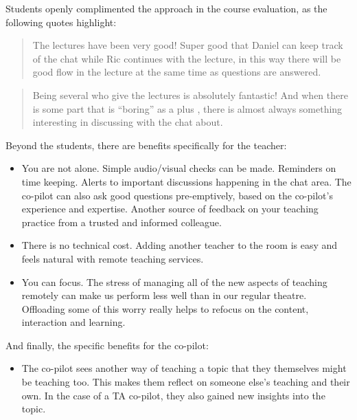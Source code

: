 \documentclass[sigconf,natbib=false]{acmart}
\begin{document}
\noindent
Students openly complimented the approach in the course evaluation, as the following quotes highlight:

\begin{quote}
The lectures have been very good! Super good that Daniel can keep track of the chat while Ric continues with the lecture, in this way there will be good flow in the lecture at the same time as questions are answered.
\end{quote}

\begin{quote}
Being several who give the lectures is absolutely fantastic! And when there is some part that is \enquote{boring} as a plus , there is almost always something interesting in discussing with the chat about.
\end{quote}

\noindent
Beyond the students, there are benefits specifically for the teacher:

\begin{itemize}
  \item You are not alone. Simple audio/visual checks can be made. Reminders on time keeping. Alerts to important discussions happening in the chat area. The co-pilot can also ask good questions pre-emptively, based on the co-pilot's experience and expertise. Another source of feedback on your teaching practice from a trusted and informed colleague.

  \item There is no technical cost. Adding another teacher to the room is easy and feels natural with remote teaching services.

  \item You can focus. The stress of managing all of the new aspects of teaching remotely can make us perform less well than in our regular theatre. Offloading some of this worry really helps to refocus on the content, interaction and learning.
\end{itemize}

\noindent
And finally, the specific benefits for the co-pilot:

\begin{itemize}
  \item The co-pilot sees another way of teaching a topic that they themselves might be teaching too. This makes them reflect on someone else's teaching and their own. In the case of a TA co-pilot, they also gained new insights into the topic.
\end{itemize}
\end{document}
